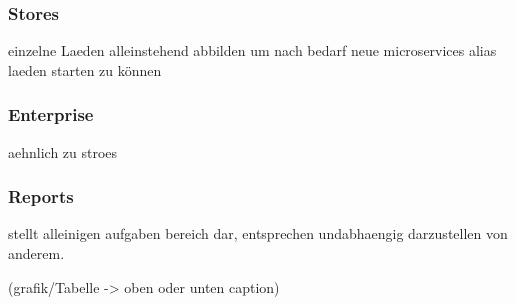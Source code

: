 		\subsubsection{Stores}
		einzelne Laeden alleinstehend abbilden um nach bedarf neue microservices alias laeden starten zu können
		
		\subsubsection{Enterprise}
		aehnlich zu stroes
		
		\subsubsection{Reports}
		stellt alleinigen aufgaben bereich dar, entsprechen undabhaengig darzustellen von anderem.




	
	
(grafik/Tabelle  -> oben oder unten caption)